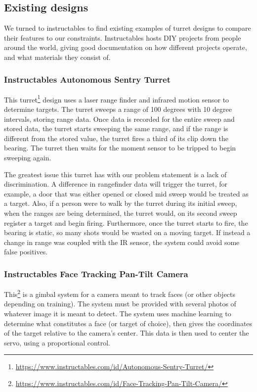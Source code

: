﻿%


\subsection{Existing designs}
We turned to instructables to find existing examples of turret designs to compare their features to our constraints. Instructables hosts DIY projects from people around the world, giving good documentation on how different projects operate, and what materials they consist of.
\subsubsection{Instructables Autonomous Sentry Turret}
This turret\footnote{\url{https://www.instructables.com/id/Autonomous-Sentry-Turret/}} design uses a laser range finder and infrared motion sensor to determine targets. The turret sweeps a range of 100 degrees with 10 degree intervals, storing range data. Once data is recorded for the entire sweep and stored data, the turret starts sweeping the same range, and if the range is different from the stored value, the turret fires a third of its clip down the bearing. The turret then waits for the moment sensor to be tripped to begin sweeping again.

The greatest issue this turret has with our problem statement is a lack of discrimination. A difference in rangefinder data will trigger the turret, for example, a door that was either opened or closed mid sweep would be treated as a target. Also, if a person were to walk by the turret during its initial sweep, when the ranges are being determined, the turret would, on its second sweep register a target and begin firing. Furthermore, once the turret starts to fire, the bearing is static, so many shots would be wasted on a moving target. If instead a change in range was coupled with the IR sensor, the system could avoid some false positives.

\subsubsection{Instructables Face Tracking Pan-Tilt Camera}
This\footnote{\url{https://www.instructables.com/id/Face-Tracking-Pan-Tilt-Camera/}} is a gimbal system for a camera meant to track faces (or other objects depending on training). The system must be provided with several photos of whatever image it is meant to detect. The system uses machine learning to determine what constitutes a face (or target of choice), then gives the coordinates of the target relative to the camera’s center. This data is then used to center the servo, using a proportional control.
        
